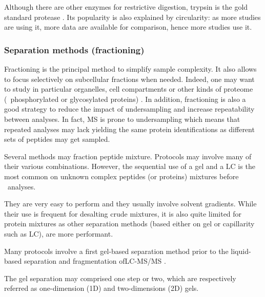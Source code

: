 Although there are other enzymes for restrictive digestion, trypsin is the gold
standard protease . Its popularity is also explained by
circularity: as more studies are using it, more data are available for comparison,
hence more studies use it.

\subsubsection{Separation methods (fractioning)}\label{subsub:sepMethods}
Fractioning is the principal method to simplify sample complexity. It also allows
to focus selectively on subcellular fractions when needed. Indeed, one may want
to study in particular organelles, cell compartments or other kinds of proteome
(\eg\ phosphorylated or glycosylated proteins) . In addition,
fractioning is also a good strategy to reduce the impact of undersampling and
increase repeatability between analyses. In fact, \gls{MS} is prone to
undersampling which means that repeated analyses may lack yielding the same
protein identifications as different sets of peptides may get sampled.

Several methods may fraction peptide mixture. Protocols may involve many of their
various combinations. However, the sequential use of a gel and a \gls{LC} is
the most common on unknown complex peptides (or proteins) mixtures before
\ms\ analyses.

They are very easy to perform and they usually involve solvent gradients. While
their use is frequent for desalting crude mixtures, it is also quite limited
for protein mixtures as other separation methods (based either on gel or
capillarity such as \gls{LC}), are more performant.

Many protocols involve a first gel-based separation method prior to the
liquid-based separation and fragmentation of\enspace\gls{LC-MS/MS}
.

The gel separation may comprised one step or two, which are respectively referred
as one-dimension (1D) and two-dimensions (2D) gels.

